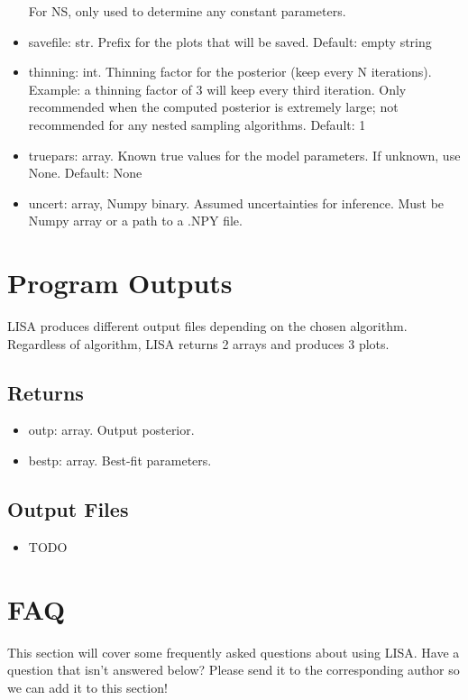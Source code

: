 \documentclass[letterpaper, 12pt]{article}
\begin{document}
\begin{itemize}
                    For NS, only used to determine any constant parameters.
\item savefile: str. Prefix for the plots that will be saved. Default: empty string
\item thinning: int. Thinning factor for the posterior (keep every N iterations). Example: a thinning factor of 3 will keep every third iteration.  Only recommended when the computed posterior is extremely large; not recommended for any nested sampling algorithms.  Default: 1
\item truepars: array. Known true values for the model parameters.  
                       If unknown, use None.  Default: None
\item uncert: array, Numpy binary. Assumed uncertainties for inference. Must be 
                                   Numpy array or a path to a .NPY file.
\end{itemize}


\section{Program Outputs}
\label{sec:outputs}

LISA produces different output files depending on the chosen algorithm.
Regardless of algorithm, LISA returns 2 arrays and produces 3 plots.

\subsection{Returns}
\begin{itemize}
\item outp: array. Output posterior.
\item bestp: array. Best-fit parameters.
\end{itemize}

\subsection{Output Files}
\begin{itemize}
\item TODO
\end{itemize}

\section{FAQ}

This section will cover some frequently asked questions about using LISA.  
Have a question that isn't answered below?  Please send it to the corresponding 
author so we can add it to this section! \newline
\end{document}
